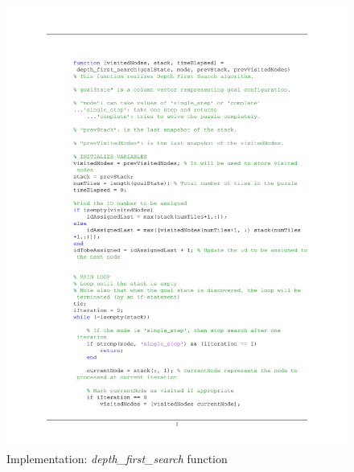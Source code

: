 \documentclass[12pt]{article}
\begin{document}
\begin{figure}[htb]
	\centering
	\includegraphics[width=1\columnwidth]{images/Code_depth_first_search.pdf}
	\caption{Implementation: \textit{depth\_first\_search} function}
	\label{}
\end{figure}
\end{document}
